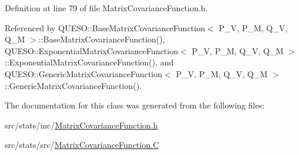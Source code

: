 Definition at line 79 of file Matrix\-Covariance\-Function.\-h.



Referenced by Q\-U\-E\-S\-O\-::\-Base\-Matrix\-Covariance\-Function$<$ P\-\_\-\-V, P\-\_\-\-M, Q\-\_\-\-V, Q\-\_\-\-M $>$\-::\-Base\-Matrix\-Covariance\-Function(), Q\-U\-E\-S\-O\-::\-Exponential\-Matrix\-Covariance\-Function$<$ P\-\_\-\-V, P\-\_\-\-M, Q\-\_\-\-V, Q\-\_\-\-M $>$\-::\-Exponential\-Matrix\-Covariance\-Function(), and Q\-U\-E\-S\-O\-::\-Generic\-Matrix\-Covariance\-Function$<$ P\-\_\-\-V, P\-\_\-\-M, Q\-\_\-\-V, Q\-\_\-\-M $>$\-::\-Generic\-Matrix\-Covariance\-Function().



The documentation for this class was generated from the following files\-:\begin{DoxyCompactItemize}
\item 
src/stats/inc/\hyperlink{_matrix_covariance_function_8h}{Matrix\-Covariance\-Function.\-h}\item 
src/stats/src/\hyperlink{_matrix_covariance_function_8_c}{Matrix\-Covariance\-Function.\-C}\end{DoxyCompactItemize}
